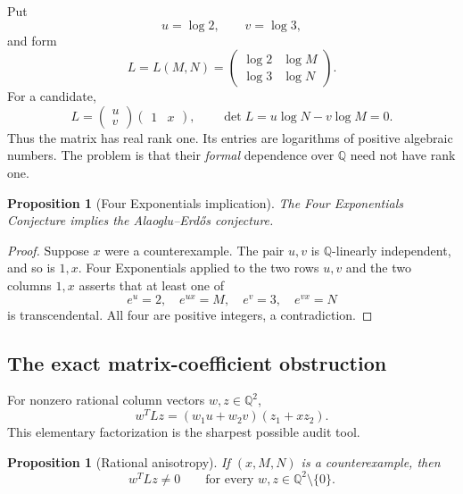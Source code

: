\documentclass[11pt]{article}
\newtheorem{proposition}[theorem]{Proposition}
\theoremstyle{definition}
\theoremstyle{remark}
\newcommand{\Q}{\mathbb{Q}}
\begin{document}
Put
\[
 u=\log2,\qquad v=\log3,
\]
and form
\begin{equation}
 L=L(M,N)=
 \begin{pmatrix}
  \log2 & \log M\\
  \log3 & \log N
 \end{pmatrix}.
 \label{eq:log-matrix}
\end{equation}
For a candidate,
\begin{equation}
 L=
 \begin{pmatrix}u\\ v\end{pmatrix}
 \begin{pmatrix}1&x\end{pmatrix},
 \qquad
 \det L=u\log N-v\log M=0.
 \label{eq:outer-product}
\end{equation}
Thus the matrix has real rank one.  Its entries are logarithms of positive algebraic
numbers.  The problem is that their \emph{formal} dependence over $\Q$ need not have rank
one.

\begin{proposition}[Four Exponentials implication]
\label{prop:four-exp}
The Four Exponentials Conjecture implies the Alaoglu--Erd\H{o}s conjecture.
\end{proposition}

\begin{proof}
Suppose $x$ were a counterexample.  The pair $u,v$ is $\Q$-linearly independent, and so is
$1,x$.  Four Exponentials applied to the two rows $u,v$ and the two columns $1,x$ asserts
that at least one of
\[
 e^u=2,
 \quad e^{ux}=M,
 \quad e^v=3,
 \quad e^{vx}=N
\]
is transcendental.  All four are positive integers, a contradiction.
\end{proof}

\subsection{The exact matrix-coefficient obstruction}

For nonzero rational column vectors $w,z\in\Q^2$, 
\begin{equation}
 w^{T}Lz=(w_1u+w_2v)(z_1+xz_2).
 \label{eq:coefficient-factorization}
\end{equation}
This elementary factorization is the sharpest possible audit tool.

\begin{proposition}[Rational anisotropy]
\label{prop:anisotropy}
If $(x,M,N)$ is a counterexample, then
\[
 w^TLz\ne0
 \qquad\text{for every }w,z\in\Q^2\setminus\{0\}.
\]
\end{proposition}
\end{document}
